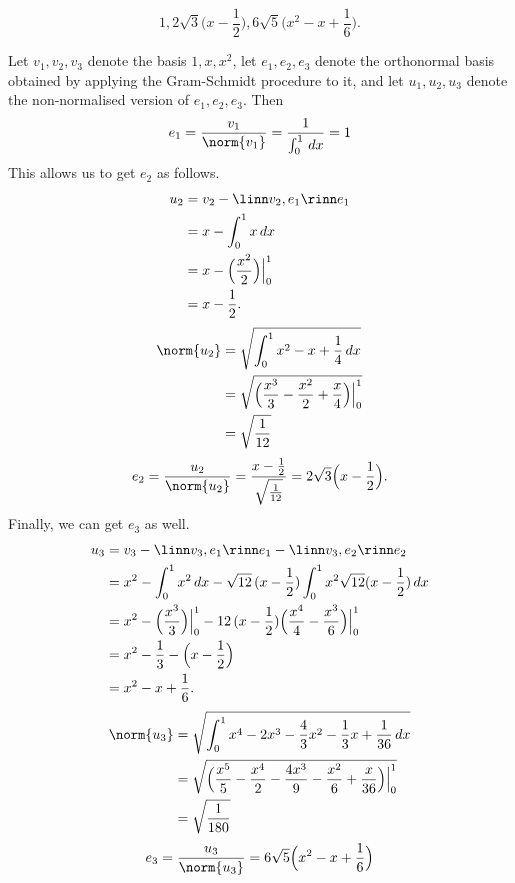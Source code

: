 \documentclass[12pt, letterpaper]{hmcpset}
\begin{document}
\begin{solution}
	\[
		\boxed{
			1, 2 \sqrt 3 \Big ( x - \frac{1}{2} \Big ), 6 \sqrt 5 \Big ( x^2 - x + \frac{1}{6} \Big ).
		}
	\]

	Let $v_1, v_2, v_3$ denote the basis $1, x, x^2$, let $e_1, e_2, e_3$ denote the orthonormal basis obtained by applying the Gram-Schmidt procedure to it, and let $u_1, u_2, u_3$ denote the non-normalised version of $e_1, e_2, e_3$. Then
	\[
		e_1 = \frac{v_1}{\norm{v_1}} = \frac{1}{\int_0^1 \, dx} = 1
	\]
	This allows us to get $e_2$ as follows.
	\[
		\begin{split}
			u_2 & = v_2 - \linn v_2, e_1 \rinn e_1 \\
			    & = x - \int_0^1 x \, dx \\
			    & = x - \Big ( \frac{x^2}{2} \Big ) \Big |_0^1 \\
			    & = x - \frac{1}{2}.
		\end{split}
	\]
	\[
		\begin{split}
			\norm{u_2} & = \sqrt{\int_0^1 x^2 - x + \frac{1}{4} \, dx} \\
				   & = \sqrt{\Big ( \frac{x^3}{3} - \frac{x^2}{2} + \frac{x}{4} \Big ) \Big |_0^1} \\
				   & = \sqrt{\frac{1}{12}}
		\end{split}
	\]
	\[
		e_2 = \frac{u_2}{\norm{u_2}} \\ = \frac{x - \frac{1}{2}}{\sqrt{\frac{1}{12}}} = 2 \sqrt{3} \Big ( x - \frac{1}{2} \Big ).
	\]
	Finally, we can get $e_3$ as well.
	\[
		\begin{split}
			u_3 & = v_3 - \linn v_3, e_1 \rinn e_1 - \linn v_3, e_2 \rinn e_2 \\
			    & = x^2 - \int_0^1 x^2 \, dx - \sqrt{12} \, (x - \frac{1}{2}) \int_0^1 x^2 \sqrt{12} (x - \frac{1}{2}) \, dx \\
			    & = x^2 - \Big ( \frac{x^3}{3} \Big ) \Big |_0^1 - 12 \, (x - \frac{1}{2}) \Big ( \frac{x^4}{4} - \frac{x^3}{6} \Big ) \Big |_0^1 \\
			    & = x^2 - \frac{1}{3} - \Big ( x - \frac{1}{2} \Big ) \\
			    & = x^2 - x + \frac{1}{6}.
		\end{split}
	\]
	\[
		\begin{split}
			\norm{u_3} & = \sqrt{\int_0^1 x^4 - 2x^3 - \frac{4}{3} x^2 - \frac{1}{3} x + \frac{1}{36} \, dx} \\
				   & = \sqrt{\Big ( \frac{x^5}{5} - \frac{x^4}{2} - \frac{4 x^3}{9} - \frac{x^2}{6} + \frac{x}{36} \Big ) \Big |_0^1} \\
				   & = \sqrt{\frac{1}{180}}
		\end{split}
	\]
	\[
		e_3 = \frac{u_3}{\norm{u_3}} = 6 \sqrt{5} \Big (x^2 - x + \frac{1}{6} \Big )
	\]
\end{solution}
\end{document}
